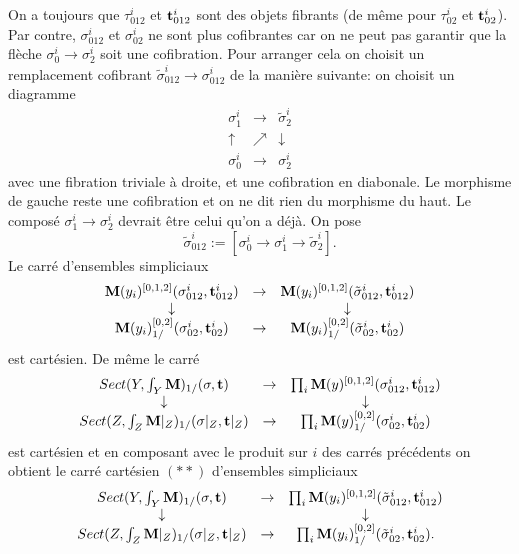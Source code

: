 \documentclass[12pt]{article}
\newcommand{\mm}{{\bf M}}
\begin{document}
On a toujours que $\tau ^i_{012}$ et ${\bf t}^i_{012}$ sont des objets fibrants
(de m\^eme pour $\tau ^i_{02}$ et ${\bf t}^i_{02}$). Par contre, $\sigma
^i_{012}$ et $\sigma ^i_{02}$ ne sont plus cofibrantes car on ne peut pas
garantir que la fl\`eche $\sigma ^i_0\rightarrow \sigma ^i_2$ soit une
cofibration.
Pour arranger cela on choisit un remplacement cofibrant
$\tilde{\sigma}^i_{012}\rightarrow  \sigma ^i_{012}$ de la mani\`ere
suivante: on
choisit un diagramme
$$
\begin{array}{ccc}
\sigma ^i_1 & \rightarrow & \tilde{\sigma}^i_2\\
\uparrow & \nearrow & \downarrow \\
\sigma ^i_0 & \rightarrow & \sigma ^i_2
\end{array}
$$
avec une fibration triviale \`a droite, et
une cofibration
en diabonale. Le morphisme de gauche reste une cofibration et on ne dit
rien du morphisme du haut. Le compos\'e $\sigma ^i_1\rightarrow \sigma ^i_2$
devrait \^etre celui qu'on a d\'ej\`a. On pose
$$
\tilde{\sigma}^i_{012}:= [\sigma ^i_0\rightarrow \sigma ^i_1 \rightarrow
\tilde{\sigma}^i_2].
$$
Le carr\'e d'ensembles simpliciaux
$$
\begin{array}{ccc}
\mm (y_i)^{[0,1,2]}(\sigma ^i_{012},{\bf t} ^i
_{012})
&\rightarrow & \mm (y_i)^{[0,1,2]}(\tilde{\sigma} ^i_{012},{\bf t} ^i
_{012})\\ \downarrow && \downarrow \\
\mm (y_i)^{[0,2]}_{1/}(\sigma ^i_{02},{\bf t}
^i_{02})
& \rightarrow & \mm (y_i)^{[0,2]}_{1/}(\tilde{\sigma} ^i_{02},{\bf t}
^i_{02})
\end{array}
$$
est cart\'esien.  De m\^eme le carr\'e
$$
\begin{array}{ccc}
Sect (Y, \int _Y\mm )_{1/}(\sigma , {\bf t} )
&\rightarrow & \prod _i \mm (y)^{[0,1,2]}(\sigma ^i_{012},{\bf t} ^i
_{012})\\ \downarrow && \downarrow \\
Sect (Z, \int _Z\mm |_Z)_{1/}(\sigma |_Z, {\bf t} |_Z)
& \rightarrow & \prod _i \mm (y)^{[0,2]}_{1/}(\sigma ^i_{02},{\bf t}
^i_{02}) \end{array}
$$
est cart\'esien et en composant avec le produit sur $i$ des carr\'es
pr\'ec\'edents
on obtient le carr\'e cart\'esien $(\ast \ast )$ d'ensembles simpliciaux
$$
\begin{array}{ccc}
Sect (Y, \int _Y\mm )_{1/}(\sigma , {\bf t} )
&\rightarrow & \prod _i \mm (y_i)^{[0,1,2]}(\tilde{\sigma} ^i_{012},{\bf t} ^i
_{012})\\ \downarrow && \downarrow \\
Sect (Z, \int _Z\mm |_Z)_{1/}(\sigma |_Z, {\bf t} |_Z)
& \rightarrow & \prod _i \mm (y_i)^{[0,2]}_{1/}(\tilde{\sigma} ^i_{02},{\bf t}
^i_{02}).
\end{array}
$$
\end{document}
